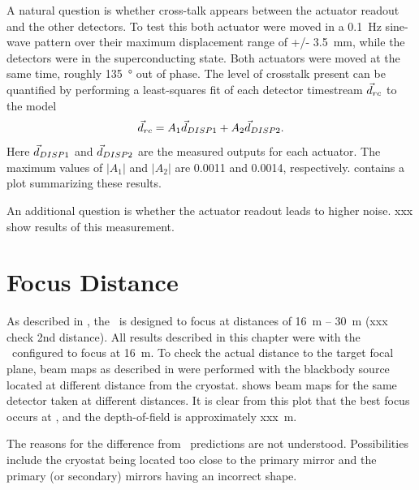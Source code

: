 A natural question is whether cross-talk appears between the actuator readout and the other detectors.
To test this both actuator were moved in a 0.1~Hz sine-wave pattern over their maximum displacement range of +/- 3.5~mm, while the detectors were in the superconducting state.
Both actuators were moved at the same time, roughly \SI{135}{\degree} out of phase.
The level of crosstalk present can be quantified by performing a least-squares fit of each detector timestream $\vec{d}_{rc}$ to the model
\begin{equation}
	 \vec{d}_{rc} = A_1 \vec{d}_{{\small DISP{1}}} + A_2 \vec{d}_{{\small DISP{2}}}.
\end{equation}
Here $\vec{d}_{{\small DISP{1}}}$ and $\vec{d}_{{\small DISP{2}}}$ are the measured outputs for each actuator.
The maximum values of $|A_1|$  and $|A_2|$ are 0.0011 and 0.0014, respectively.
 contains a plot summarizing these results.

An additional question is whether the actuator readout leads to higher noise.
xxx show results of this measurement.


\section{Focus Distance}\label{s:focus-distance}

As described in , the \Imager\ is designed to focus at distances of 16~m -- 30~m (xxx check 2nd distance).
All results described in this chapter were with the \Imager\ configured to focus at 16~m.
To check the actual distance to the target focal plane, beam maps as described in  were performed with the blackbody source located at different distance from the cryostat.
 shows beam maps for the same detector taken at different distances.
It is clear from this plot that the best focus occurs at , and the depth-of-field is approximately xxx~m.

The reasons for the difference from \ZEMAX\ predictions are not understood.
Possibilities include the cryostat being located too close to the primary mirror and the primary (or secondary) mirrors having an incorrect shape.

